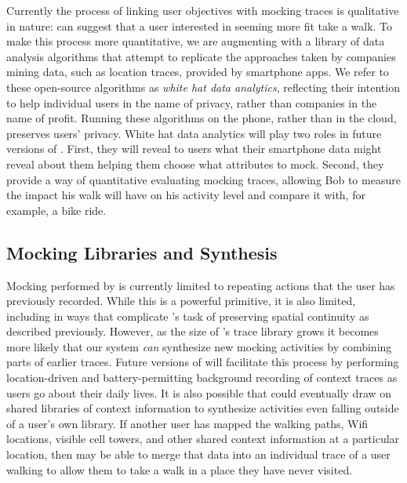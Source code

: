 Currently the process of linking user objectives with mocking traces is
qualitative in nature: \PocketMocker{} can suggest that a user interested in
seeming more fit take a walk. To make this process more quantitative, we are
augmenting \PocketMocker{} with a library of data analysis algorithms that
attempt to replicate the approaches taken by companies mining data, such as
location traces, provided by smartphone apps. We refer to these
open-source algorithms as \textit{white hat data analytics}, reflecting their
intention to help individual users in the name of privacy, rather than
companies in the name of profit. Running these algorithms on the phone,
rather than in the cloud, preserves users' privacy. White hat data analytics
will play two roles in future versions of \PocketMocker{}. First, they will
reveal to users what their smartphone data might reveal about them helping
them choose what attributes to mock. Second, they provide a way of
quantitative evaluating mocking traces, allowing Bob to measure the impact
his walk will have on his activity level and compare it with, for example, a
bike ride.

\subsection{Mocking Libraries and Synthesis}

Mocking performed by \PocketMocker{} is currently limited to repeating
actions that the user has previously recorded. While this is a powerful
primitive, it is also limited, including in ways that complicate
\PocketMocker{}'s task of preserving spatial continuity as described
previously. However, as the size of \PocketMocker{}'s trace library grows it
becomes more likely that our system \textit{can} synthesize new mocking
activities by combining parts of earlier traces. Future versions of
\PocketMocker{} will facilitate this process by performing location-driven
and battery-permitting background recording of context traces as users go
about their daily lives. It is also possible that \PocketMocker{} could
eventually draw on shared libraries of context information to synthesize
activities even falling outside of a user's own library. If another
\PocketMocker{} user has mapped the walking paths, Wifi locations, visible
cell towers, and other shared context information at a particular location,
then \PocketMocker{} may be able to merge that data into an individual trace
of a user walking to allow them to take a walk in a place they have never
visited.

